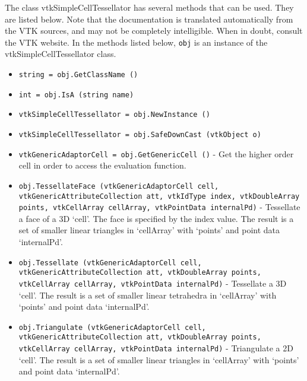 The class vtkSimpleCellTessellator has several methods that can be used.
  They are listed below.
Note that the documentation is translated automatically from the VTK sources,
and may not be completely intelligible.  When in doubt, consult the VTK website.
In the methods listed below, \verb|obj| is an instance of the vtkSimpleCellTessellator class.
\begin{itemize}
\item  \verb|string = obj.GetClassName ()|

\item  \verb|int = obj.IsA (string name)|

\item  \verb|vtkSimpleCellTessellator = obj.NewInstance ()|

\item  \verb|vtkSimpleCellTessellator = obj.SafeDownCast (vtkObject o)|

\item  \verb|vtkGenericAdaptorCell = obj.GetGenericCell ()| -  Get the higher order cell in order to access the evaluation function.

\item  \verb|obj.TessellateFace (vtkGenericAdaptorCell cell, vtkGenericAttributeCollection att, vtkIdType index, vtkDoubleArray points, vtkCellArray cellArray, vtkPointData internalPd)| -  Tessellate a face of a 3D `cell'. The face is specified by the
 index value.
 The result is a set of smaller linear triangles in `cellArray' with
 `points' and point data `internalPd'.
 
 
 
 
 
 
 

\item  \verb|obj.Tessellate (vtkGenericAdaptorCell cell, vtkGenericAttributeCollection att, vtkDoubleArray points, vtkCellArray cellArray, vtkPointData internalPd)| -  Tessellate a 3D `cell'. The result is a set of smaller linear
 tetrahedra in `cellArray' with `points' and point data `internalPd'.
 
 
 
 
 
 

\item  \verb|obj.Triangulate (vtkGenericAdaptorCell cell, vtkGenericAttributeCollection att, vtkDoubleArray points, vtkCellArray cellArray, vtkPointData internalPd)| -  Triangulate a 2D `cell'. The result is a set of smaller linear triangles
 in `cellArray' with `points' and point data `internalPd'.
 

\end{itemize}
